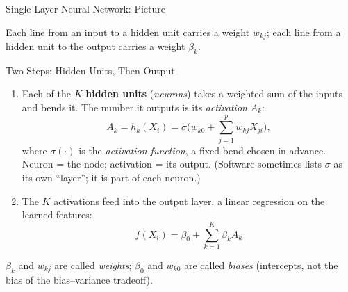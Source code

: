 \documentclass[aspectratio=169,11pt,xcolor=dvipsnames]{beamer}
\newcommand{\core}{\,\raisebox{0.6pt}{\textcolor{corestar}{$\bigstar$}}}
\begin{document}
\begin{frame}{Single Layer Neural Network: Picture\core}
\begin{center}
\end{center}
\vskip-6pt
{\footnotesize Each line from an input to a hidden unit carries a weight $w_{kj}$; each
line from a hidden unit to the output carries a weight $\beta_k$.}
\end{frame}

\begin{frame}{Two Steps: Hidden Units, Then Output\core}
\begin{enumerate}\itemsep2pt
  \item Each of the $K$ \textbf{hidden units} (\textit{neurons}) takes a weighted sum of the inputs
        and bends it. The number it outputs is its \textit{activation} $A_k$:
  \[
    A_k = h_k(X_i) = \sigma\Big(w_{k0} + \sum_{j=1}^p w_{kj}X_{ji}\Big),
  \]
        where $\sigma(\cdot)$ is the \textit{activation function}, a fixed bend chosen in advance.
        Neuron = the node; activation = its output. (Software sometimes lists $\sigma$ as its own
        ``layer''; it is part of each neuron.)
  \item The $K$ activations feed into the output layer, a linear regression on the
        learned features:
  \[
    f(X_i) = \beta_0 + \sum_{k=1}^K \beta_k A_k
  \]
\end{enumerate}
\vskip3pt
{\small $\beta_k$ and $w_{kj}$ are called \textit{weights}; $\beta_0$ and $w_{k0}$
are called \textit{biases} (intercepts, not the bias of the bias--variance tradeoff).}
\end{frame}
\end{document}
